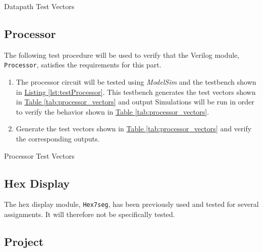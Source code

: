 \begin{table}[htbp]
    \centering
    \caption{Datapath Test Vectors\label{tab:datapath_vectors}}
\end{table}


\subsection{Processor} %
\label{sub:processor_pro}

The following test procedure will be used to verify that the Verilog module, \verb|Processor|, satisfies the requirements for this part.

\begin{enumerate}
    \item The processor circuit will be tested using \emph{ModelSim} and the testbench shown in \hyperref[lst:testProcessor]{Listing \ref*{lst:testProcessor}}.
    This testbench generates the test vectors shown in \hyperref[tab:processor_vectors]{Table \ref*{tab:processor_vectors}} and output %
    Simulations will be run in order to verify the behavior shown in \hyperref[tab:processor_vectors]{Table \ref*{tab:processor_vectors}}.
    \item Generate the test vectors shown in \hyperref[tab:processor_vectors]{Table \ref*{tab:processor_vectors}} and verify the corresponding outputs.
\end{enumerate}

\begin{table}[htbp]
    \centering
    \caption{Processor Test Vectors\label{tab:processor_vectors}}
\end{table}


\subsection{Hex Display} %
\label{sub:hex_display}

The hex display module, \verb|Hex7seg|, has been previously used and tested for several assignments.
It will therefore not be specifically tested.

\subsection{Project} %
\label{sub:project_pro}

